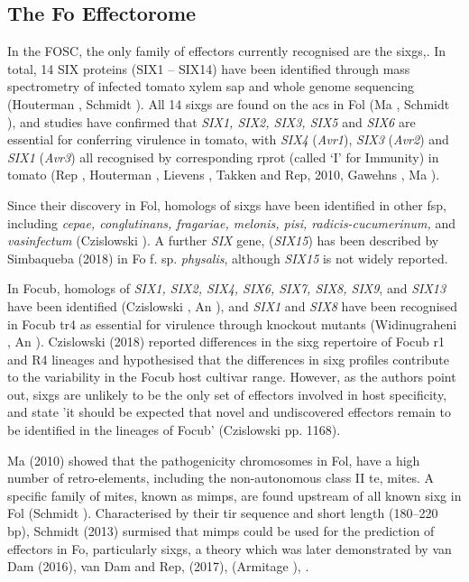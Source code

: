 \subsection{The \acl{Fo} Effectorome}

In the \ac{FOSC}, the only family of effectors currently recognised are the \acp{sixg},. In total, 14 SIX proteins (SIX1 – SIX14) have been identified through mass spectrometry of infected tomato xylem sap and whole genome sequencing (Houterman , Schmidt ).  All 14 \acp{sixg} are found on the \acp{ac} in \ac{Fol} (Ma , Schmidt ), and studies have confirmed that \textit{SIX1, SIX2, SIX3, SIX5} and \textit{SIX6} are essential for conferring virulence in tomato, with  \textit{SIX4} (\textit{Avr1}), \textit{SIX3} (\textit{Avr2}) and \textit{SIX1} (\textit{Avr3}) all recognised by corresponding \ac{rprot} (called ‘I’ for Immunity) in tomato (Rep , Houterman , Lievens , Takken and Rep, 2010, Gawehns , Ma ).  

Since their discovery in \ac{Fol}, homologs of \acp{sixg} have been identified in other \ac{fsp}, including \textit{cepae, conglutinans, fragariae, melonis, pisi, radicis-cucumerinum,} and \textit{vasinfectum} (Czislowski ). A further \textit{SIX} gene, (\textit{SIX15}) has been described by Simbaqueba \et (2018) in \acl{Fo} f. sp. \textit{physalis}, although \textit{SIX15} is not widely reported. 

In \ac{Focub}, homologs of \textit{SIX1, SIX2, SIX4, SIX6, SIX7, SIX8, SIX9}, and \textit{SIX13} have been identified (Czislowski , An ), and \textit{SIX1} and \textit{SIX8} have been recognised in \ac{Focub} \ac{tr4} as essential for virulence through knockout mutants (Widinugraheni , An ). Czislowski \et (2018) reported differences in the \ac{sixg} repertoire of \ac{Focub} \ac{r1} and R4 lineages and hypothesised that the differences in \ac{sixg} profiles contribute to the variability in the \ac{Focub} host cultivar range.  However, as the authors point out, \acp{sixg} are unlikely to be the only set of effectors involved in host specificity, and state 'it should be expected that novel and undiscovered effectors remain to be identified in the lineages of \ac{Focub}' (Czislowski  pp. 1168).  

Ma \et (2010) showed that the pathogenicity chromosomes in \ac{Fol}, have a high number of retro-elements, including the non-autonomous class II \ac{te}, \ac{mites}. A specific family of \ac{mites}, known as \acp{mimp}, are found upstream of all known \ac{sixg} in \ac{Fol} (Schmidt ). Characterised by their \ac{tir} sequence and short length (180–220 \acs{bp}), Schmidt \et (2013) surmised that \acp{mimp} could be used for the prediction of effectors in \ac{Fo}, particularly \acp{sixg}, a theory which was later demonstrated by van Dam \et (2016), van Dam and Rep, (2017),  (Armitage ), \parencite{FoEC2}.  

